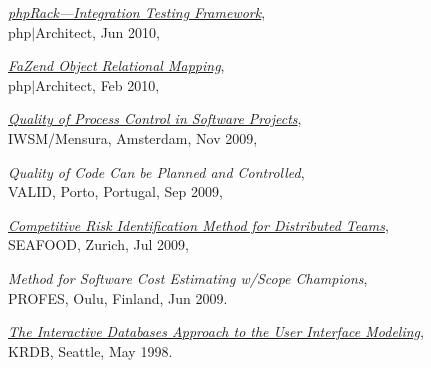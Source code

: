 \documentclass[12pt]{article}
\begin{document}
\emph{\href{https://www.yegor256.com/pdf/2010/phpArchitect-phpRack.pdf}{phpRack---Integration Testing Framework}},\\
php$|$Architect, Jun 2010,

\emph{\href{https://www.yegor256.com/pdf/2010/phpArchitect-fazend-orm.pdf}{FaZend Object Relational Mapping}},\\
php$|$Architect, Feb 2010,

\emph{\href{https://www.yegor256.com/pdf/2009/IWSM09-article.pdf}{Quality of Process Control in Software Projects}},\\
IWSM/Mensura, Amsterdam, Nov 2009,

\emph{Quality of Code Can be Planned and Controlled},\\
VALID, Porto, Portugal, Sep 2009,

\emph{\href{https://www.yegor256.com/pdf/2009/SEAFOOD09-article.pdf}{Competitive Risk Identification Method for Distributed Teams}},\\
SEAFOOD, Zurich, Jul 2009,

\emph{Method for Software Cost Estimating w/Scope Champions},\\
PROFES, Oulu, Finland, Jun 2009.

\emph{\href{https://www.yegor256.com/pdf/1998/KRDB98-article.pdf}{The Interactive Databases Approach to the User Interface Modeling}},\\
KRDB, Seattle, May 1998.
\end{document}
